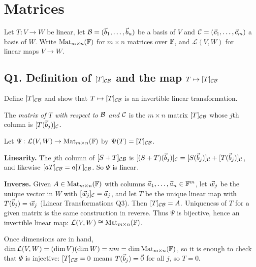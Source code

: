 \section{Matrices}

Let $T:V\to W$ be linear, let $\mathcal{B}=(\vec{b}_1,\ldots,\vec{b}_n)$ be a basis of $V$ and
$\mathcal{C}=(\vec{c}_1,\ldots,\vec{c}_m)$ a basis of $W$. Write $\operatorname{Mat}_{m\times n}(\mathbb{F})$
for $m\times n$ matrices over $\mathbb{F}$, and $\mathcal{L}(V,W)$ for linear maps
$V\to W$.

\subsection{Q1. Definition of $[T]_{\mathcal{C}\mathcal{B}}$ and the map $T\mapsto[T]_{\mathcal{C}\mathcal{B}}$}

\begin{promptbox}
Define $[T]_{\mathcal{C}\mathcal{B}}$ and show that $T\mapsto[T]_{\mathcal{C}\mathcal{B}}$ is an invertible
linear transformation.
\end{promptbox}

\begin{coursebox}
\begin{definition*}
The \emph{matrix of $T$ with respect to $\mathcal{B}$ and $\mathcal{C}$} is the $m\times n$
matrix $[T]_{\mathcal{C}\mathcal{B}}$ whose $j$th column is $[T(\vec{b}_j)]_{\mathcal{C}}$.
\end{definition*}

Let $\Psi:\mathcal{L}(V,W)\to\operatorname{Mat}_{m\times n}(\mathbb{F})$ by $\Psi(T)=[T]_{\mathcal{C}\mathcal{B}}$.

\textbf{Linearity.}
The $j$th column of $[S+T]_{\mathcal{C}\mathcal{B}}$ is
$[(S+T)(\vec{b}_j)]_{\mathcal{C}}=[S(\vec{b}_j)]_{\mathcal{C}}+[T(\vec{b}_j)]_{\mathcal{C}}$, and likewise
$[aT]_{\mathcal{C}\mathcal{B}}=a[T]_{\mathcal{C}\mathcal{B}}$. So $\Psi$ is linear.

\textbf{Inverse.}
Given $A\in\operatorname{Mat}_{m\times n}(\mathbb{F})$ with columns $\vec{a}_1,\ldots,\vec{a}_n\in\mathbb{F}^m$,
let $\vec{w}_j$ be the unique vector in $W$ with $[\vec{w}_j]_{\mathcal{C}}=\vec{a}_j$, and let
$T$ be the unique linear map with $T(\vec{b}_j)=\vec{w}_j$ (Linear Transformations Q3).
Then $[T]_{\mathcal{C}\mathcal{B}}=A$. Uniqueness of $T$ for a given matrix is the same
construction in reverse. Thus $\Psi$ is bijective, hence an invertible linear
map: $\mathcal{L}(V,W)\cong\operatorname{Mat}_{m\times n}(\mathbb{F})$.
\end{coursebox}

\begin{laterbox}
Once dimensions are in hand,
$\dim\mathcal{L}(V,W)=(\dim V)(\dim W)=nm=\dim\operatorname{Mat}_{m\times n}(\mathbb{F})$, so it is
enough to check that $\Psi$ is injective: $[T]_{\mathcal{C}\mathcal{B}}=0$ means $T(\vec{b}_j)=\vec{0}$
for all $j$, so $T=0$.
\end{laterbox}

